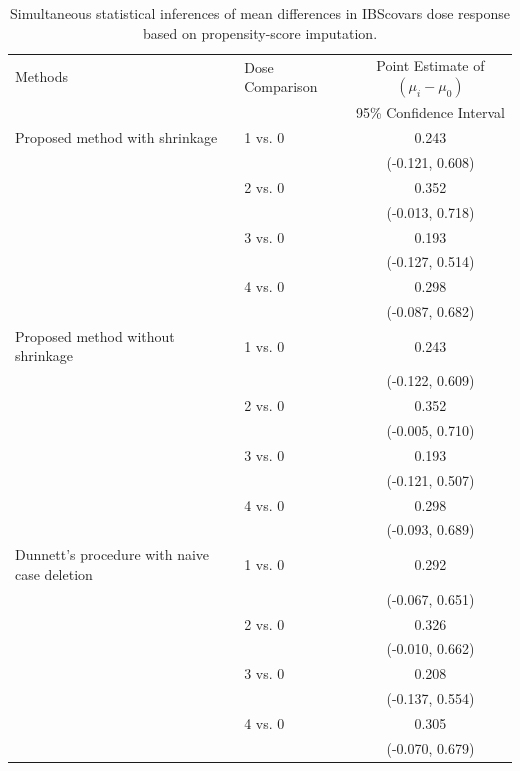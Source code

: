 \begin{table}[htbp]
\centering
\caption{Simultaneous statistical inferences of mean differences in IBScovars dose response based on propensity-score imputation.}
\label{tab:ibs_application}
\begin{tabular}{llc}
\hline
Methods & Dose Comparison & Point Estimate of $(\mu_i-\mu_0)$ \\
 &  & 95\% Confidence Interval \\
\hline
Proposed method with shrinkage & 1 vs. 0 & 0.243 \\
 &  & (-0.121, 0.608) \\
 & 2 vs. 0 & 0.352 \\
 &  & (-0.013, 0.718) \\
 & 3 vs. 0 & 0.193 \\
 &  & (-0.127, 0.514) \\
 & 4 vs. 0 & 0.298 \\
 &  & (-0.087, 0.682) \\
Proposed method without shrinkage & 1 vs. 0 & 0.243 \\
 &  & (-0.122, 0.609) \\
 & 2 vs. 0 & 0.352 \\
 &  & (-0.005, 0.710) \\
 & 3 vs. 0 & 0.193 \\
 &  & (-0.121, 0.507) \\
 & 4 vs. 0 & 0.298 \\
 &  & (-0.093, 0.689) \\
Dunnett's procedure with naive case deletion & 1 vs. 0 & 0.292 \\
 &  & (-0.067, 0.651) \\
 & 2 vs. 0 & 0.326 \\
 &  & (-0.010, 0.662) \\
 & 3 vs. 0 & 0.208 \\
 &  & (-0.137, 0.554) \\
 & 4 vs. 0 & 0.305 \\
 &  & (-0.070, 0.679) \\
\hline
\end{tabular}
\end{table}
